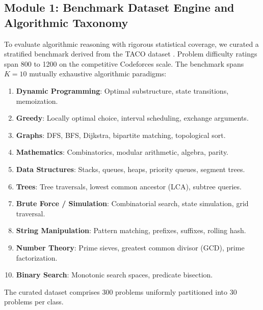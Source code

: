 \documentclass{ieeeaccess}
\begin{document}
\subsection{Module 1: Benchmark Dataset Engine and Algorithmic Taxonomy}
To evaluate algorithmic reasoning with rigorous statistical coverage, we curated a stratified benchmark derived from the TACO dataset \cite{li2023taco}. Problem difficulty ratings span 800 to 1200 on the competitive Codeforces scale. The benchmark spans $K=10$ mutually exhaustive algorithmic paradigms:
\begin{enumerate}
    \item \textbf{Dynamic Programming}: Optimal substructure, state transitions, memoization.
    \item \textbf{Greedy}: Locally optimal choice, interval scheduling, exchange arguments.
    \item \textbf{Graphs}: DFS, BFS, Dijkstra, bipartite matching, topological sort.
    \item \textbf{Mathematics}: Combinatorics, modular arithmetic, algebra, parity.
    \item \textbf{Data Structures}: Stacks, queues, heaps, priority queues, segment trees.
    \item \textbf{Trees}: Tree traversals, lowest common ancestor (LCA), subtree queries.
    \item \textbf{Brute Force / Simulation}: Combinatorial search, state simulation, grid traversal.
    \item \textbf{String Manipulation}: Pattern matching, prefixes, suffixes, rolling hash.
    \item \textbf{Number Theory}: Prime sieves, greatest common divisor (GCD), prime factorization.
    \item \textbf{Binary Search}: Monotonic search spaces, predicate bisection.
\end{enumerate}
The curated dataset comprises 300 problems uniformly partitioned into 30 problems per class.
\end{document}
